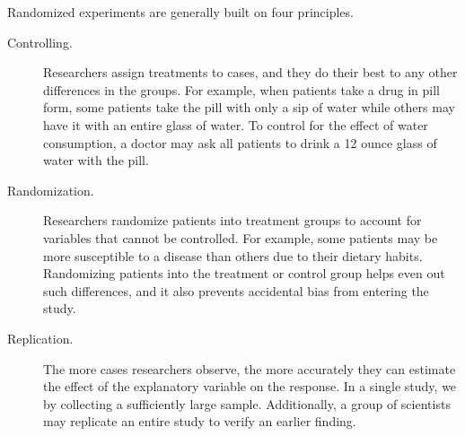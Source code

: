 Randomized experiments are generally built on four principles.
\begin{description}
\item[Controlling.] Researchers assign treatments to cases, and they do their best to  any other differences in the groups. For example, when patients take a drug in pill form, some patients take the pill with only a sip of water while others may have it with an entire glass of water. To control for the effect of water consumption, a doctor may ask all patients to drink a 12 ounce glass of water with the pill.
\item[Randomization.] Researchers randomize patients into treatment groups to account for variables that cannot be controlled. For example, some patients may be more susceptible to a disease than others due to their dietary habits. Randomizing patients into the treatment or control group helps even out such differences, and it also prevents accidental bias from entering the study.
\item[Replication.] The more cases researchers observe, the more accurately they can estimate the effect of the explanatory variable on the response. In a single study, we  by collecting a sufficiently large sample. Additionally, a group of scientists may replicate an entire study to verify an earlier finding.


\end{description}
